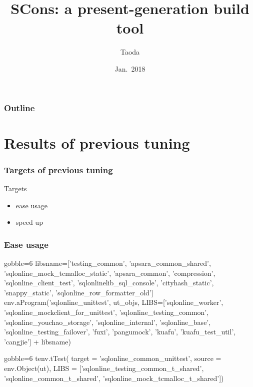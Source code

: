 \documentclass[lualatex]{beamer}
\title[SCons]{SCons: a present-generation build tool}
\author{Taoda}
\institute{Alibaba Cloud}
\date{Jan.\ 2018}
\begin{document}
\begin{frame}
\titlepage
\end{frame}

\begin{frame}
  \frametitle{Outline}
  \tableofcontents
\end{frame}

\section{Results of previous tuning}

\begin{frame}
  \frametitle{Targets of previous tuning}

  \begin{block}{Targets}
    \begin{itemize}
    \item ease usage
    \item speed up
    \end{itemize}
  \end{block}
\end{frame}

\begin{frame}[fragile]
  \frametitle{Ease usage}

  \begin{block}{3.6}
    \begin{py*}{gobble=6}
      libsname=['testing_common', 'apsara_common_shared',
        'sqlonline_mock_tcmalloc_static', 'apsara_common', 'compression', 
        'sqlonline_client_test', 'sqlonlinelib_sql_console',
        'cityhash_static',
        'snappy_static', 'sqlonline_row_formatter_old']
      env.aProgram('sqlonline_unittest', ut_objs,
        LIBS=['sqlonline_worker', 'sqlonline_mockclient_for_unittest', 
          'sqlonline_testing_common', 'sqlonline_youchao_storage', 
          'sqlonline_internal', 'sqlonline_base', 'sqlonline_testing_failover',
          'fuxi', 'pangumock', 'kuafu', 'kuafu_test_util', 'cangjie'] + libsname)
    \end{py*}
  \end{block}
  
  \begin{block}{3.7}
    \begin{py*}{gobble=6}
      tenv.tTest(
        target = 'sqlonline_common_unittest',
        source = env.Object(ut),
        LIBS = ['sqlonline_testing_common_t_shared',
                'sqlonline_common_t_shared',
                'sqlonline_mock_tcmalloc_t_shared'])
    \end{py*}
  \end{block}
\end{frame}
\end{document}
